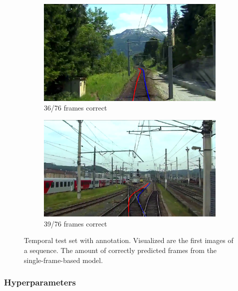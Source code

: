 \begin{figure}[H]
    \begin{subfigure}[b]{0.48\textwidth}
        \centering
        \includegraphics[width=\textwidth]{PICs/experiments/temporalModels/partlyRichtig.png}
        \caption{36/76 frames correct}
    \end{subfigure}
    \hfill
    \begin{subfigure}[b]{0.48\textwidth}
        \centering
        \includegraphics[width=\textwidth]{PICs/experiments/temporalModels/partlyRichtig2.png}
        \caption{39/76 frames correct}
    \end{subfigure}
    \caption{Temporal test set with annotation. Visualized are the first images of a sequence. The amount of correctly predicted frames from the single-frame-based model.}
    \label{fig:temporalTestSet}
\end{figure}

\subsubsection{Hyperparameters}

